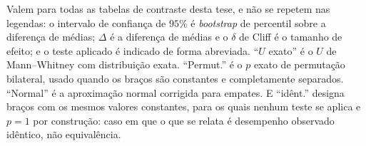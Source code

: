 Valem para todas as tabelas de contraste desta tese, e não se repetem nas legendas: o
intervalo de confiança de $95\%$ é \textit{bootstrap} de percentil sobre a diferença de
médias; $\Delta$ é a diferença de médias e o $\delta$ de Cliff é o tamanho de efeito; e
o teste aplicado é indicado de forma abreviada. ``$U$ exato'' é o $U$ de
Mann--Whitney com distribuição exata. ``Permut.'' é o $p$ exato de permutação bilateral,
usado quando os braços são constantes e completamente separados. ``Normal'' é a
aproximação normal corrigida para empates. E ``idênt.'' designa braços com os mesmos
valores constantes, para os quais nenhum teste se aplica e $p=1$ por construção: caso em que o que se relata é desempenho observado idêntico, não equivalência.

\begin{table}[htb]
\centering
\caption{Família de comparação primária completa: três contrastes
---~proposta contra o supervisor heurístico genérico (HEU) e contra a variante de
seleção de um fator (HEU-sel), ambos em \texttt{default}; e a ablação
somente-\textit{keep-out} contra a patrulha fixa portando o mesmo \textit{keep-out}
(KOa contra KOF), em \texttt{route\_hazard}~--- por cinco desfechos, totalizando quinze
testes. $n$ é o par de execuções válidas. Convenção de sinal, intervalo e nomenclatura
dos testes seguem o protocolo desta seção. A correção de Holm é interna a esta família
de quinze testes. Gerada por \texttt{gerar\_tabela\_familia.py} a partir de
\texttt{familia\_confirmatoria.csv}.}
\label{tab:res-familia}
\scriptsize
\setlength{\tabcolsep}{3.5pt}
\renewcommand{\arraystretch}{1.2}

\renewcommand{\arraystretch}{1.0}
\end{table}

